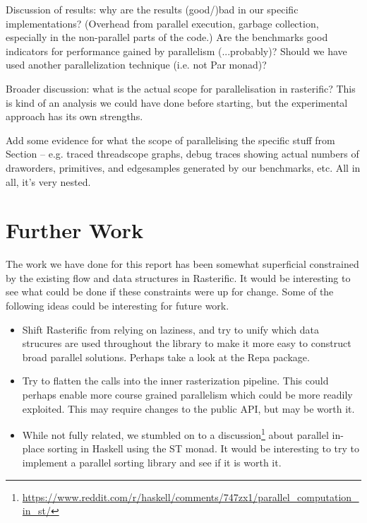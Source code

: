 \documentclass[12pt, a4paper]{article}
\begin{document}
Discussion of results: why are the results (good/)bad in our specific implementations? (Overhead from parallel execution, garbage collection, especially in the non-parallel parts of the code.)
Are the benchmarks good indicators for performance gained by parallelism (...probably)? Should we have used another parallelization technique (i.e. not Par monad)?

Broader discussion: what is the actual scope for parallelisation in rasterific? This is kind of an analysis we could have done before starting, but the experimental approach has its own strengths.

Add some evidence for what the scope of parallelising the specific stuff from Section \label{experiments} -- e.g. traced threadscope graphs, debug traces showing actual numbers of draworders, primitives, and edgesamples generated by our benchmarks, etc. All in all, it's very nested.

\section{Further Work}\label{furtherwork}
The work we have done for this report has been somewhat superficial constrained by the existing flow and data structures in Rasterific.
 It would be interesting to see what could be done if these constraints were up for change. Some of the following ideas could be interesting for future work.
\begin{itemize}
\item Shift Rasterific from relying on laziness, and try to unify which data strucures are used throughout the library to make it more easy to construct
  broad parallel solutions. Perhaps take a look at the Repa package.
\item Try to flatten the calls into the inner rasterization pipeline. This could perhaps enable more course grained parallelism which could be more readily exploited.
  This may require changes to the public API, but may be worth it.
\item While not fully related, we stumbled on to a discussion\footnote{\url{https://www.reddit.com/r/haskell/comments/747zx1/parallel_computation_in_st/}}
  about parallel in-place sorting in Haskell using the ST monad.
  It would be interesting to try to implement a parallel sorting library and see if it is worth it.
\end{itemize}
\end{document}
